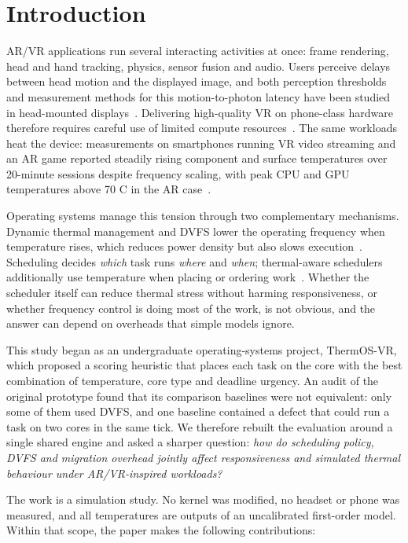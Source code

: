 \documentclass[conference]{IEEEtran}
\begin{document}
\section{Introduction}\label{sec:intro}
AR/VR applications run several interacting activities at once: frame rendering, head and hand tracking, physics, sensor fusion and audio. Users perceive delays between head motion and the displayed image, and both perception thresholds and measurement methods for this motion-to-photon latency have been studied in head-mounted displays~\cite{jerald2009,zhao2017}. Delivering high-quality VR on phone-class hardware therefore requires careful use of limited compute resources~\cite{lai2017}. The same workloads heat the device: measurements on smartphones running VR video streaming and an AR game reported steadily rising component and surface temperatures over 20-minute sessions despite frequency scaling, with peak CPU and GPU temperatures above 70 \textdegree{}C in the AR case~\cite{zhang2020}.

Operating systems manage this tension through two complementary mechanisms. Dynamic thermal management and DVFS lower the operating frequency when temperature rises, which reduces power density but also slows execution~\cite{brooks2001,pillai2001}. Scheduling decides \emph{which} task runs \emph{where} and \emph{when}; thermal-aware schedulers additionally use temperature when placing or ordering work~\cite{kong2012}. Whether the scheduler itself can reduce thermal stress without harming responsiveness, or whether frequency control is doing most of the work, is not obvious, and the answer can depend on overheads that simple models ignore.

This study began as an undergraduate operating-systems project, ThermOS-VR, which proposed a scoring heuristic that places each task on the core with the best combination of temperature, core type and deadline urgency. An audit of the original prototype found that its comparison baselines were not equivalent: only some of them used DVFS, and one baseline contained a defect that could run a task on two cores in the same tick. We therefore rebuilt the evaluation around a single shared engine and asked a sharper question: \emph{how do scheduling policy, DVFS and migration overhead jointly affect responsiveness and simulated thermal behaviour under AR/VR-inspired workloads?}

The work is a simulation study. No kernel was modified, no headset or phone was measured, and all temperatures are outputs of an uncalibrated first-order model. Within that scope, the paper makes the following contributions:
\end{document}
